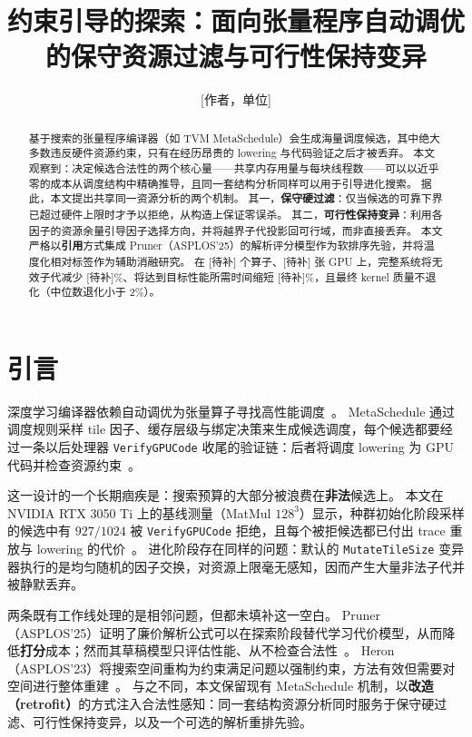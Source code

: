 \documentclass[UTF8]{ctexart}
\title{约束引导的探索：面向张量程序自动调优的保守资源过滤与可行性保持变异}
\author{[作者，单位]}
\begin{document}
\maketitle

\begin{abstract}
基于搜索的张量程序编译器（如 TVM MetaSchedule）会生成海量调度候选，其中绝大多数违反硬件资源约束，只有在经历昂贵的 lowering 与代码验证之后才被丢弃。
本文观察到：决定候选合法性的两个核心量——共享内存用量与每块线程数——可以以近乎零的成本从调度结构中精确推导，且同一套结构分析同样可以用于引导进化搜索。
据此，本文提出共享同一资源分析的两个机制。
其一，\textbf{保守硬过滤}：仅当候选的可靠下界已超过硬件上限时才予以拒绝，从构造上保证零误杀。
其二，\textbf{可行性保持变异}：利用各因子的资源余量引导因子选择方向，并将越界子代投影回可行域，而非直接丢弃。
本文严格以\textbf{引用}方式集成 Pruner（ASPLOS'25）的解析评分模型作为软排序先验，并将温度化相对标签作为辅助消融研究。
在 [待补] 个算子、[待补] 张 GPU 上，完整系统将无效子代减少 [待补]\%、将达到目标性能所需时间缩短 [待补]\%，且最终 kernel 质量不退化（中位数退化小于 2\%）。
\end{abstract}


\section{引言}

深度学习编译器依赖自动调优为张量算子寻找高性能调度~\cite{ansor,metaschedule}。
MetaSchedule 通过调度规则采样 tile 因子、缓存层级与绑定决策来生成候选调度，每个候选都要经过一条以后处理器 \texttt{VerifyGPUCode} 收尾的验证链：后者将调度 lowering 为 GPU 代码并检查资源约束~\cite{metaschedule}。

这一设计的一个长期痼疾是：搜索预算的大部分被浪费在\textbf{非法}候选上。
本文在 NVIDIA RTX 3050 Ti 上的基线测量（MatMul $128^3$）显示，种群初始化阶段采样的候选中有 $927/1024$ 被 \texttt{VerifyGPUCode} 拒绝，且每个被拒候选都已付出 trace 重放与 lowering 的代价~\cite{implplan}。
进化阶段存在同样的问题：默认的 \texttt{MutateTileSize} 变异器执行的是均匀随机的因子交换，对资源上限毫无感知，因而产生大量非法子代并被静默丢弃。

两条既有工作线处理的是相邻问题，但都未填补这一空白。
Pruner（ASPLOS'25）证明了廉价解析公式可以在探索阶段替代学习代价模型，从而降低\textbf{打分}成本；然而其草稿模型只评估性能、从不检查合法性~\cite{pruner}。
Heron（ASPLOS'23）将搜索空间重构为约束满足问题以强制约束，方法有效但需要对空间进行整体重建~\cite{heron}。
与之不同，本文保留现有 MetaSchedule 机制，以\textbf{改造（retrofit）}的方式注入合法性感知：同一套结构资源分析同时服务于保守硬过滤、可行性保持变异，以及一个可选的解析重排先验。
\end{document}
